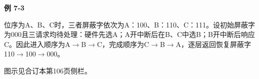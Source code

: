 {\color{ink}\bfseries 例 7-3}\par\vspace{1bp}位序为A、B、C时，三者屏蔽字依次为A：100、B：110、C：111。设初始屏蔽字为000且三请求均待处理：硬件先选A；A开中断后在B、C中选B；B开中断后响应C。因此进入顺序为A\(\to \)B\(\to \)C，完成顺序为C\(\to \)B\(\to \)A，逐层返回恢复屏蔽字110\(\to \)100\(\to \)000。\par {\color{ink}图示见合订本第106页侧栏。}
